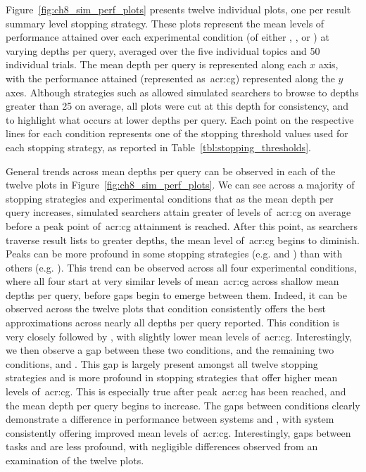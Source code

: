 Figure~\ref{fig:ch8_sim_perf_plots} presents twelve individual plots, one per result summary level stopping strategy. These plots represent the mean levels of performance attained over each experimental condition (of either , ,  or ) at varying depths per query, averaged over the five individual topics and 50 individual trials. The mean depth per query is represented along each $x$ axis, with the performance attained (represented as~\gls{acr:cg}) represented along the $y$ axes. Although strategies such as  allowed simulated searchers to browse to depths greater than 25 on average, all plots were cut at this depth for consistency, and to highlight what occurs at lower depths per query. Each point on the respective lines for each condition represents one of the stopping threshold values used for each stopping strategy, as reported in Table~\ref{tbl:stopping_thresholds}.

General trends across mean depths per query can be observed in each of the twelve plots in Figure~\ref{fig:ch8_sim_perf_plots}. We can see across a majority of stopping strategies and experimental conditions that as the mean depth per query increases, simulated searchers attain greater of levels of~\gls{acr:cg} on average before a peak point of~\gls{acr:cg} attainment is reached. After this point, as searchers traverse result lists to greater depths, the mean level of~\gls{acr:cg} begins to diminish. Peaks can be more profound in some stopping strategies (e.g.  and ) than with others (e.g. ). This trend can be observed across all four experimental conditions, where all four start at very similar levels of mean~\gls{acr:cg} across shallow mean depths per query, before gaps begin to emerge between them. Indeed, it can be observed across the twelve plots that condition  consistently offers the best approximations across nearly all depths per query reported. This condition is very closely followed by , with slightly lower mean levels of~\gls{acr:cg}. Interestingly, we then observe a gap between these two conditions, and the remaining two conditions,  and . This gap is largely present amongst all twelve stopping strategies and is more profound in stopping strategies that offer higher mean levels of~\gls{acr:cg}. This is especially true after peak~\gls{acr:cg} has been reached, and the mean depth per query begins to increase. The gaps between conditions clearly demonstrate a difference in performance between systems  and , with system  consistently offering improved mean levels of~\gls{acr:cg}. Interestingly, gaps between tasks  and  are less profound, with negligible differences observed from an examination of the twelve plots.

